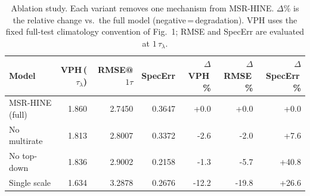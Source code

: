\begin{table}[t]
\centering
\caption{Ablation study. Each variant removes one mechanism from MSR-HINE. $\Delta$\% is the relative change vs.\ the full model (negative\,=\,degradation). VPH uses the fixed full-test climatology convention of Fig.~1; RMSE and SpecErr are evaluated at $1\,\tau_\lambda$.}
\label{tab:ablation}
\begin{tabular}{lrrrrrr}
\toprule
Model & VPH\,($\tau_\lambda$) & RMSE@$1\tau$ & SpecErr & $\Delta$VPH\,\% & $\Delta$RMSE\,\% & $\Delta$SpecErr\,\% \\
\midrule
MSR-HINE (full) & 1.860 & 2.7450 & 0.3647 & +0.0 & +0.0 & +0.0 \\
No multirate & 1.813 & 2.8007 & 0.3372 & -2.6 & -2.0 & +7.6 \\
No top-down & 1.836 & 2.9002 & 0.2158 & -1.3 & -5.7 & +40.8 \\
Single scale & 1.634 & 3.2878 & 0.2676 & -12.2 & -19.8 & +26.6 \\
\bottomrule
\end{tabular}
\end{table}